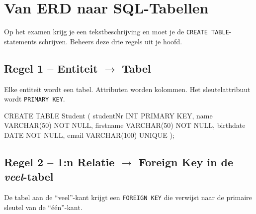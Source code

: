 \documentclass[a4paper,11pt]{article}
\begin{document}
\section{Van ERD naar SQL-Tabellen}

\begin{waarschuwing}
Op het examen krijg je een tekstbeschrijving en moet je de \texttt{CREATE TABLE}-statements schrijven.
Beheers deze drie regels uit je hoofd.
\end{waarschuwing}

\subsection{Regel 1 -- Entiteit $\rightarrow$ Tabel}

Elke entiteit wordt een tabel. Attributen worden kolommen. Het sleutelattribuut wordt \texttt{PRIMARY KEY}.

\begin{voorbeeld}
\begin{sqllisting}
CREATE TABLE Student (
    studentNr   INT          PRIMARY KEY,
    name        VARCHAR(50)  NOT NULL,
    firstname   VARCHAR(50)  NOT NULL,
    birthdate   DATE         NOT NULL,
    email       VARCHAR(100) UNIQUE
);
\end{sqllisting}
\end{voorbeeld}

\subsection{Regel 2 -- 1:n Relatie $\rightarrow$ Foreign Key in de \emph{veel}-tabel}

De tabel aan de ``veel''-kant krijgt een \texttt{FOREIGN KEY} die verwijst naar de primaire sleutel van de ``één''-kant.
\end{document}
